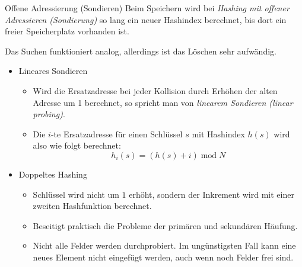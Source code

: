 \documentclass[german]{../spicker}
\begin{document}
\begin{defi}{Offene Adressierung (Sondieren)}
    Beim Speichern wird bei \emph{Hashing mit offener Adressieren (Sondierung)} so lang ein neuer Hashindex berechnet, bis dort ein freier Speicherplatz vorhanden ist.

    Das Suchen funktioniert analog, allerdings ist das Löschen sehr aufwändig.

    \begin{itemize}
        \item Lineares Sondieren
              \begin{itemize}
                  \item Wird die Ersatzadresse bei jeder Kollision durch Erhöhen der alten Adresse um 1 berechnet, so spricht man von \emph{linearem Sondieren (linear probing)}.
                  \item Die $i$-te Ersatzadresse für einen Schlüssel $s$ mit Hashindex $h(s)$ wird also wie folgt berechnet:
                        $$
                            h_i(s) = (h(s) + i) \operatorname{mod} N
                        $$
              \end{itemize}
        \item Doppeltes Hashing
              \begin{itemize}
                  \item Schlüssel wird nicht um $1$ erhöht, sondern der Inkrement wird mit einer zweiten Hashfunktion berechnet.
                  \item Beseitigt praktisch die Probleme der primären und sekundären Häufung.
                  \item Nicht alle Felder werden durchprobiert. Im ungünstigsten Fall kann eine neues Element nicht eingefügt werden, auch wenn noch Felder frei sind.
              \end{itemize}
    \end{itemize}
\end{defi}
\end{document}
